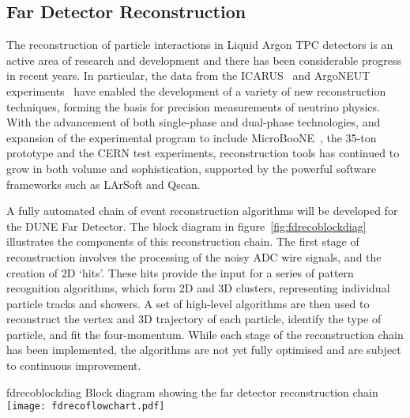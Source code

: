 
\subsection{Far Detector Reconstruction}
\label{sec:detectors-sc-physics-software-reconstruction-fd}

The reconstruction of particle interactions in Liquid Argon TPC
detectors is an active area of research and development and
there has been considerable progress in recent years. 
In particular, the data from the ICARUS~\cite{Amerio:2004ze,icarus-url,ICARUS-pizero,Antonello:2012hu} 
and ArgoNEUT experiments~\cite{Adamson:2013/02/28tla,argoneut-url,Acciarri:2013met}
have enabled the development of a variety of new reconstruction techniques,
forming the basis for precision measurements of neutrino physics.
With the advancement of both single-phase and dual-phase technologies,
and expansion of the experimental program to include MicroBooNE~\cite{Chen:2007ae,microboone-url},
the 35-ton prototype and the CERN test experiments,
reconstruction tools has continued to grow in both volume and sophistication,
supported by the powerful software frameworks such as LArSoft and Qscan.

A fully automated chain of event reconstruction algorithms
will be developed for the DUNE Far Detector.
The block diagram in figure~\ref{fig:fdrecoblockdiag} illustrates 
the components of this reconstruction chain.
The first stage of reconstruction involves the processing of the
noisy ADC wire signals, and the creation of 2D `hits'. 
These hits provide the input for a series of pattern recognition algorithms,
which form 2D and 3D clusters, representing individual particle tracks and showers.
A set of high-level algorithms are then used to reconstruct the vertex
and 3D trajectory of each particle, identify the type of particle,
and fit the four-momentum.
While each stage of the reconstruction chain has been implemented,
the algorithms are not yet fully optimised and are subject to
continuous improvement.

\begin{cdrfigure}{fdrecoblockdiag}
{Block diagram showing the far detector reconstruction chain}
\texttt{[image: fdrecoflowchart.pdf]}
\end{cdrfigure}


